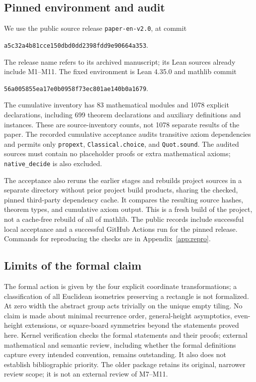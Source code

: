 \subsection{Pinned environment and audit}
We use the public source release \texttt{paper-en-v2.0}, at commit
\begin{center}
\small\texttt{a5c32a4b81cce150dbd0dd2398fdd9e90664a353}.
\end{center}
The release name refers to its archived manuscript; its Lean sources
already include M1--M11. The fixed environment is Lean 4.35.0 and
mathlib commit
\begin{center}
\small\texttt{56a005855ea17e0b0958f73ec801ae140b0a1679}.
\end{center}
The cumulative inventory has 83 mathematical modules and 1078 explicit
declarations, including 699 theorem declarations and auxiliary
definitions and instances. These are source-inventory counts, not 1078
separate results of the paper. The recorded cumulative acceptance
audits transitive axiom dependencies and permits only
\texttt{propext}, \texttt{Classical.choice}, and \texttt{Quot.sound}.
The audited sources must contain no placeholder proofs or extra
mathematical axioms; \texttt{native\_decide} is also excluded.

The acceptance also reruns the earlier stages and rebuilds project
sources in a separate directory without prior project build products,
sharing the checked, pinned third-party dependency cache.
It compares the resulting source hashes, theorem types, and cumulative
axiom output. This is a fresh build of the project, not a cache-free
rebuild of all of mathlib. The public records include successful local
acceptance and a successful GitHub Actions run for the pinned release.
Commands for reproducing the checks are in Appendix~\ref{app:repro}.

\subsection{Limits of the formal claim}
The formal action is given by the four explicit coordinate
transformations; a classification of all Euclidean isometries preserving
a rectangle is not formalized. At zero width the abstract group acts
trivially on the unique empty tiling. No claim is made about minimal
recurrence order, general-height asymptotics, even-height extensions,
or square-board symmetries beyond the statements proved here.
Kernel verification checks the formal statements and their proofs;
external mathematical and semantic review, including whether the formal
definitions capture every intended convention, remains outstanding.
It also does not establish bibliographic priority. The older
 package retains its original, narrower review scope;
it is not an external review of M7--M11.
